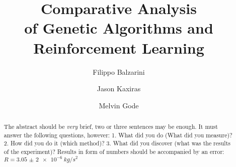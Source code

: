 \begin{frontmatter}
%
\title{%
Comparative Analysis \\ of Genetic Algorithms
and Reinforcement Learning\\
}
%
\author[UppsalaUniversity]{Filippo Balzarini} 
\author[UppsalaUniversity]{Jason Kaxiras}
\author[UppsalaUniversity]{Melvin Gode}
\address[UppsalaUniversity]{Department of Computer Science, Uppsala University, Uppsala, Sweden}
%
%
\renewcommand*{\today}{\MonthYearDateFormat\displaydate{dateName}} 
%
\begin{abstract}

The abstract should be \textit{very} brief, two or three sentences may be enough. It must answer the following questions, however:
1. What did you do (What did you measure)?
2. How did you do it (which method)?
3. What did you discover (what was the results of the experiment)?
Results in form of numbers should be accompanied by an error: $R=\SI{3,05(2)e-6}{kg/s^{2}}$

\end{abstract}
%
\end{frontmatter}
%
%
%

